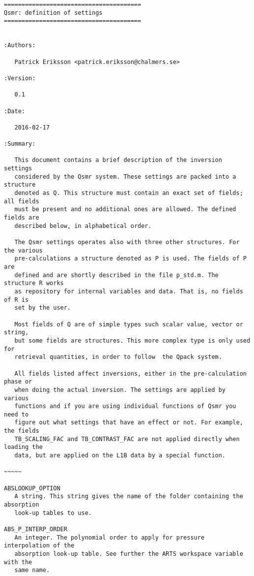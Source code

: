 \begin{verbatim}
=======================================
Qsmr: definition of settings
=======================================


:Authors: 

   Patrick Eriksson <patrick.eriksson@chalmers.se> 

:Version: 
        
   0.1 

:Date:

   2016-02-17

:Summary: 

   This document contains a brief description of the inversion settings
   considered by the Qsmr system. These settings are packed into a structure
   denoted as Q. This structure must contain an exact set of fields; all fields
   must be present and no additional ones are allowed. The defined fields are
   described below, in alphabetical order.

   The Qsmr settings operates also with three other structures. For the various
   pre-calculations a structure denoted as P is used. The fields of P are
   defined and are shortly described in the file p_std.m. The structure R works
   as repository for internal variables and data. That is, no fields of R is
   set by the user.

   Most fields of Q are of simple types such scalar value, vector or string,
   but some fields are structures. This more complex type is only used for
   retrieval quantities, in order to follow  the Qpack system.

   All fields listed affect inversions, either in the pre-calculation phase or
   when doing the actual inversion. The settings are applied by various
   functions and if you are using individual functions of Qsmr you need to
   figure out what settings that have an effect or not. For example, the fields
   TB_SCALING_FAC and TB_CONTRAST_FAC are not applied directly when loading the
   data, but are applied on the L1B data by a special function. 
   
~~~~~

ABSLOOKUP_OPTION
   A string. This string gives the name of the folder containing the absorption
   look-up tables to use.

ABS_P_INTERP_ORDER
   An integer. The polynomial order to apply for pressure interpolation of the
   absorption look-up table. See further the ARTS workspace variable with the
   same name.


\end{verbatim}
